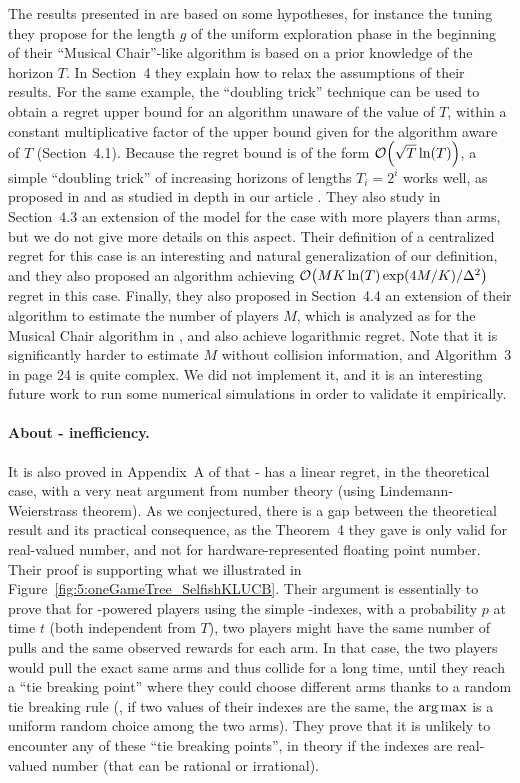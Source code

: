 The results presented in \cite{LugosiMehrabian18} are based on some hypotheses, for instance the tuning they propose for the length $g$ of the uniform exploration phase in the beginning of their ``Musical Chair''-like algorithm is based on a prior knowledge of the horizon $T$.
In Section~4 they explain how to relax the assumptions of their results.
For the same example, the ``doubling trick'' technique can be used to obtain a regret upper bound for an algorithm unaware of the value of $T$, within a constant multiplicative factor of the upper bound given for the algorithm aware of $T$ (Section~4.1). Because the regret bound is of the form $\mathop{}\mathopen{}\mathcal{O}\mathopen{}\left(\sqrt{T} \ln(T)\right)$, a simple ``doubling trick'' of increasing horizons of lengths $T_i = 2^i$ works well, as proposed in \cite{CesaLugosi06} and as studied in depth in our article \cite{Besson2018DoublingTricks}.
They also study in Section~4.3 an extension of the model for the case with more players than arms, but we do not give more details on this aspect. Their definition of a centralized regret for this case is an interesting and natural generalization of our definition, and they also proposed an algorithm achieving $\mathop{}\mathopen{}\mathcal{O}\mathopen{}\left(M K \ln(T) \exp(4M/K) / \Delta^2\right)$ regret in this case.
Finally, they also proposed in Section~4.4 an extension of their algorithm to estimate the number of players $M$, which is analyzed as for the Musical Chair algorithm in \cite{Rosenski16}, and also achieve logarithmic regret.
Note that it is significantly harder to estimate $M$ without collision information, and Algorithm~3 in page 24 is quite complex.
We did not implement it, and it is an interesting future work to run some numerical simulations in order to validate it empirically.


\paragraph{About \Selfish-\UCB{} inefficiency.}
%
It is also proved in Appendix~A of \cite{BoursierPerchet18} that \Selfish-\UCB{} has a linear regret, in the theoretical case, with a very neat argument from number theory (using Lindemann-Weierstrass theorem). As we conjectured, there is a gap between the theoretical result and its practical consequence, as the Theorem~4 they gave is only valid for real-valued number, and not for hardware-represented floating point number.
Their proof is supporting what we illustrated in Figure~\ref{fig:5:oneGameTree_SelfishKLUCB}.
Their argument is essentially to prove that for \Selfish-powered players using the simple \UCB-indexes, with a probability $p$ at time $t$ (both independent from $T$), two players might have the same number of pulls and the same observed rewards for each arm. In that case, the two players would pull the exact same arms and thus collide for a long time, until they reach a ``tie breaking point'' where they could choose different arms thanks to a random tie breaking rule (\eg, if two values of their \UCB{} indexes are the same, the $\operatorname*{arg\,max}$ is a uniform random choice among the two arms).
They prove that it is unlikely to encounter any of these ``tie breaking points'', in theory if the \UCB{} indexes are real-valued number (that can be rational or irrational).


